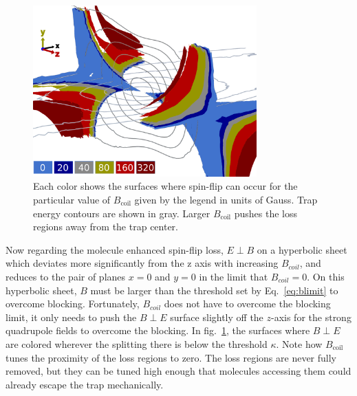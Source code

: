 \documentclass[%
 reprint,
 amsmath,amssymb,
 aps,
prl,
]{revtex4-1}
\begin{document}
\begin{figure}
\includegraphics[width=86mm]{LossSurfaces/Loss_Surface_Chunks_recolored_legend.png}%
\caption{
Each color shows the surfaces where spin-flip can occur for the particular value of $B_\text{coil}$ given by the legend in units of Gauss. Trap energy contours are shown in gray. Larger $B_\text{coil}$ pushes the loss regions away from the trap center.
\label{fig:LSurfs}}
\end{figure}

Now regarding the molecule enhanced spin-flip loss, $E\!\perp\! B$ on a hyperbolic sheet which deviates more significantly from the z axis with increasing $B_{coil}$, and reduces to the pair of planes $x=0$ and $y=0$ in the limit that $B_{coil} = 0$. On this hyperbolic sheet, $B$ must be larger than the threshold set by Eq.~\ref{eq:blimit} to overcome blocking. Fortunately, $B_{coil}$ does not have to overcome the blocking limit, it only needs to push the $B\!\perp\! E$ surface slightly off the $z$-axis for the strong  quadrupole fields to overcome the blocking. In fig.~\ref{fig:LSurfs}, the surfaces where $B\!\perp\! E$ are colored wherever the splitting there is below the threshold $\kappa$. Note how $B_\text{coil}$ tunes the proximity of the loss regions to zero. The loss regions are never fully removed, but they can be tuned high enough that molecules accessing them could already escape the trap mechanically.
\end{document}
